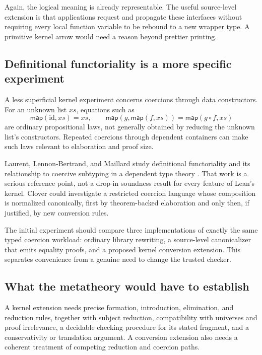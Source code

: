 \documentclass[11pt,a4paper]{article}
\newcommand{\id}{\mathrm{id}}
\theoremstyle{definition}
\theoremstyle{remark}
\begin{document}
Again, the logical meaning is already representable. The useful source-level
extension is that applications request and propagate these interfaces without
requiring every local function variable to be rebound to a new wrapper type.
A primitive kernel arrow would need a reason beyond prettier printing.

\subsection{Definitional functoriality is a more specific experiment}

A less superficial kernel experiment concerns coercions through data
constructors. For an unknown list $xs$, equations such as
\[
 \mathsf{map}(\id,xs)=xs,
 \qquad
 \mathsf{map}(g,\mathsf{map}(f,xs))
       =\mathsf{map}(g\circ f,xs)
\]
are ordinary propositional laws, not generally obtained by reducing the unknown
list's constructors. Repeated coercions through dependent containers can make
such laws relevant to elaboration and proof size.

Laurent, Lennon-Bertrand, and Maillard study definitional functoriality and its
relationship to coercive subtyping in a dependent type theory
\cite{functoriality}. That work is a serious reference point, not a drop-in
soundness result for every feature of Lean's kernel. Clover could investigate
a restricted coercion language whose composition is normalized canonically,
first by theorem-backed elaboration and only then, if justified, by new
conversion rules.

The initial experiment should compare three implementations of exactly the
same typed coercion workload: ordinary library rewriting, a source-level
canonicalizer that emits equality proofs, and a proposed kernel conversion
extension. This separates convenience from a genuine need to change the trusted
checker.

\subsection{What the metatheory would have to establish}

A kernel extension needs precise formation, introduction, elimination, and
reduction rules, together with subject reduction, compatibility with universes
and proof irrelevance, a decidable checking procedure for its stated fragment,
and a conservativity or translation argument. A conversion extension also
needs a coherent treatment of competing reduction and coercion paths.
\end{document}
